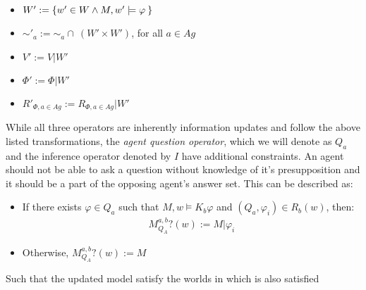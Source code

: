 \begin{itemize}
	\item $W' := \left\{ w' \in W \land M, w' \models \varphi\: \right\}$
	\item $\sim'_a := \sim_a \cap \:(W' \times W')$, for all $a \in Ag$
	\item $V' := V | W'$
	\item $\Phi' := \Phi | W'$
	\item $R'_{\Phi, a\in Ag} := R_{\Phi, a\in Ag} | W'$ 
\end{itemize}
While all three operators are inherently information updates and follow the above listed transformations, the \textit{agent question operator}, which we will denote as $Q_a$ and the inference operator denoted by $I$ have additional constraints. An agent should not be able to ask a question without knowledge of it's presupposition and it should be a part of the opposing agent's answer set. This can be described as:
\begin{itemize}
	\item If there exists $\varphi \in Q_a$ such that $M, w \models K_b\varphi$ and $(Q_a, \varphi_i) \in R_b (w)$, then:
	\begin{align}
		M^{a,b}_{Q_A}?(w) := M |\varphi_i
	\end{align}
	\item Otherwise, $M^{a,b}_{Q_{A}}?(w) := M$
\end{itemize}
Such that the updated model satisfy the worlds in which \proposition is also satisfied

